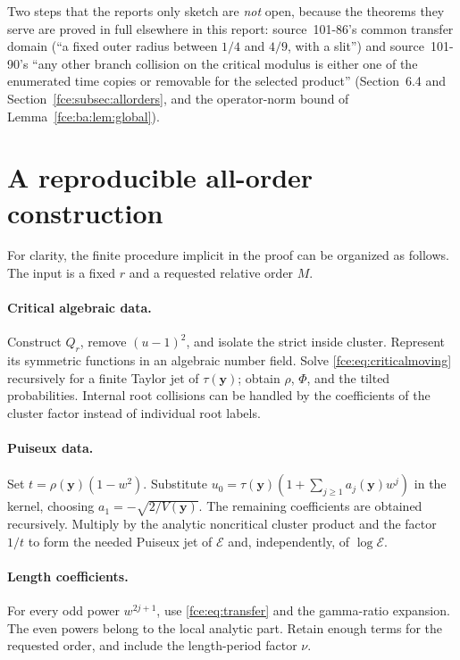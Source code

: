 \documentclass[11pt,a4paper]{article}
\numberwithin{equation}{section}
\theoremstyle{definition}\newtheorem{definition}[theorem]{Definition}
\theoremstyle{remark}\newtheorem{remark}[theorem]{Remark}
\newcommand{\E}{\mathcal E}
\begin{document}
Two steps that the reports only sketch are \emph{not} open, because the
theorems they serve are proved in full elsewhere in this report: source~101-86's
common transfer domain (``a fixed outer radius between $1/4$ and $4/9$, with a
slit'') and source~101-90's ``any other branch collision on the critical
modulus is either one of the enumerated time copies or removable for the
selected product'' (Section~6.4 and Section~\ref{fce:subsec:allorders}, and the
operator-norm bound of Lemma~\ref{fce:ba:lem:global}).

\appendix
\section{A reproducible all-order construction}\label{fce:app:algorithm}
For clarity, the finite procedure implicit in the proof can be organized
as follows. The input is a fixed $r$ and a requested relative order $M$.

\paragraph{Critical algebraic data.}
Construct $Q_r$, remove $(u-1)^2$, and isolate the strict inside cluster.
Represent its symmetric functions in an algebraic number field. Solve
\eqref{fce:eq:criticalmoving} recursively for a finite Taylor jet of
$\tau(\boldsymbol y)$; obtain $\rho$, $\Phi$, and the tilted probabilities.
Internal root collisions can be handled by the coefficients of the
cluster factor instead of individual root labels.

\paragraph{Puiseux data.}
Set $t=\rho(\boldsymbol y)(1-w^2)$. Substitute
$u_0=\tau(\boldsymbol y)(1+\sum_{j\ge1}a_j(\boldsymbol y)w^j)$ in the
kernel, choosing $a_1=-\sqrt{2/V(\boldsymbol y)}$. The remaining
coefficients are obtained recursively. Multiply by the analytic
noncritical cluster product and the factor $1/t$ to form the needed
Puiseux jet of $\E$ and, independently, of $\log\E$.

\paragraph{Length coefficients.}
For every odd power $w^{2j+1}$, use \eqref{fce:eq:transfer} and the gamma-ratio
expansion. The even powers belong to the local analytic part. Retain
enough terms for the requested order, and include the length-period
factor $\nu$.
\end{document}
